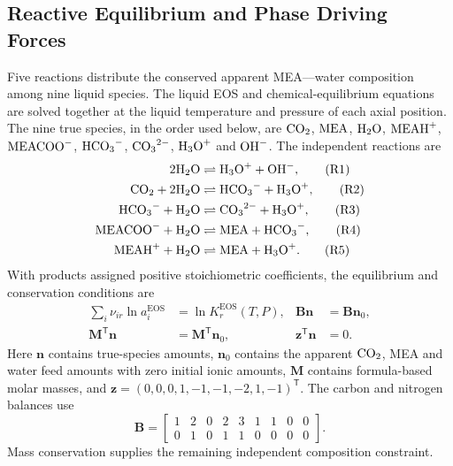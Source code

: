 \subsection{Reactive Equilibrium and Phase Driving Forces}\label{subsec:thermodynamics}
Five reactions distribute the conserved apparent MEA--\COtwo--water composition among nine liquid species.
The liquid EOS and chemical-equilibrium equations are solved together at the liquid temperature and pressure of each axial position.
The nine true species, in the order used below, are \(\COtwo\), \(\MEA\), \(\HtwoO\), \(\MEAH\), \(\MEACOO\), \(\HCOthree\), \(\ce{CO3^{2-}}\), \(\ce{H3O+}\) and \(\ce{OH-}\).
The independent reactions are
\begin{align}
2\HtwoO &\rightleftharpoons \ce{H3O+}+\ce{OH-}, \tag{R1}\label{eq:reactive-r1}\\
\COtwo+2\HtwoO &\rightleftharpoons \HCOthree+\ce{H3O+}, \tag{R2}\label{eq:reactive-r2}\\
\HCOthree+\HtwoO &\rightleftharpoons \ce{CO3^{2-}}+\ce{H3O+}, \tag{R3}\label{eq:reactive-r3}\\
\MEACOO+\HtwoO &\rightleftharpoons \MEA+\HCOthree, \tag{R4}\label{eq:reactive-r4}\\
\MEAH+\HtwoO &\rightleftharpoons \MEA+\ce{H3O+}. \tag{R5}\label{eq:reactive-r5}
\end{align}
With products assigned positive stoichiometric coefficients, the equilibrium and conservation conditions are
\begin{align}
\sum_i\nu_{ir}\ln a_i^{\mathrm{EOS}}&=\ln K_r^{\mathrm{EOS}}(T,P),&
\mathbf B\mathbf n&=\mathbf B\mathbf n_0,\\
\mathbf M^{\mathsf T}\mathbf n&=\mathbf M^{\mathsf T}\mathbf n_0,&
\mathbf z^{\mathsf T}\mathbf n&=0.
\end{align}
Here \(\mathbf n\) contains true-species amounts, \(\mathbf n_0\) contains the apparent \(\COtwo\), MEA and water feed amounts with zero initial ionic amounts, \(\mathbf M\) contains formula-based molar masses, and \(\mathbf z=(0,0,0,1,-1,-1,-2,1,-1)^{\mathsf T}\).
The carbon and nitrogen balances use
\begin{equation}
\mathbf B=
\begin{bmatrix}
1&2&0&2&3&1&1&0&0\\
0&1&0&1&1&0&0&0&0
\end{bmatrix}.
\end{equation}
Mass conservation supplies the remaining independent composition constraint.

